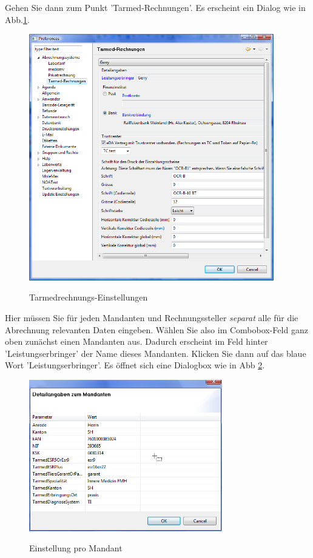 \documentclass[a4paper]{scrartcl}
\begin{document}
\medskip

Gehen Sie dann zum Punkt 'Tarmed-Rechnungen'. Es erscheint ein Dialog wie in Abb.\ref{fig:abr4}.
\begin{figure}
    \center
  \includegraphics[width=0.95\textwidth]{abr4}\\
  \caption{Tarmedrechnungs-Einstellungen}\label{fig:abr4}
\end{figure}
Hier müssen Sie für jeden Mandanten und Rechnungssteller \textit{separat} alle für die Abrechnung relevanten Daten eingeben. Wählen Sie also im Combobox-Feld ganz oben zunächst einen Mandanten aus. Dadurch erscheint im Feld hinter 'Leistungserbringer' der Name dieses Mandanten. Klicken Sie dann auf das blaue Wort 'Leistungserbringer'. Es öffnet sich eine Dialogbox wie in Abb \ref{fig:abr5}.
\begin{figure}
  \center
  \includegraphics[width=0.75\textwidth]{abr5}\\
  \caption{Einstellung pro Mandant}\label{fig:abr5}
\end{figure}
\end{document}
